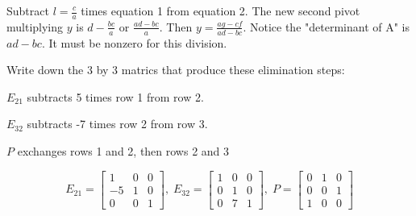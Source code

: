\documentclass[answers]{worksheet}
\begin{document}
\begin{answer}
    Subtract $l=\frac{c}{a}$ times equation 1 from equation 2. The new second pivot multiplying $y$ is $d-\frac{bc}{a}$ or $\frac{ad-bc}{a}$. Then $y=\frac{ag-cf}{ad-bc}$. 
    Notice the "determinant of A" is $ad-bc$. It must be nonzero for this division.
\end{answer}

\begin{question}
    Write down the 3 by 3 matrics that produce these elimination steps:
    \begin{parts}
        \item $E_{21}$ subtracts 5 times row 1 from row 2.
        \item $E_{32}$ subtracts -7 times row 2 from row 3.
        \item $P$ exchanges rows 1 and 2, then rows 2 and 3
    \end{parts}
\end{question}

\begin{answer}
    \begin{equation}
        E_{21}=\begin{bmatrix}
            1 & 0 & 0 \\
            -5 & 1 & 0 \\
            0 & 0 & 1
        \end{bmatrix}
        ,\; E_{32}=\begin{bmatrix}
            1 & 0 & 0 \\ 
            0 & 1 & 0 \\
            0 & 7 & 1
        \end{bmatrix}
        ,\; P=\begin{bmatrix}
            0 & 1 & 0 \\
            0 & 0 & 1 \\
            1 & 0 & 0
        \end{bmatrix}
    \end{equation}
\end{answer}
\end{document}
